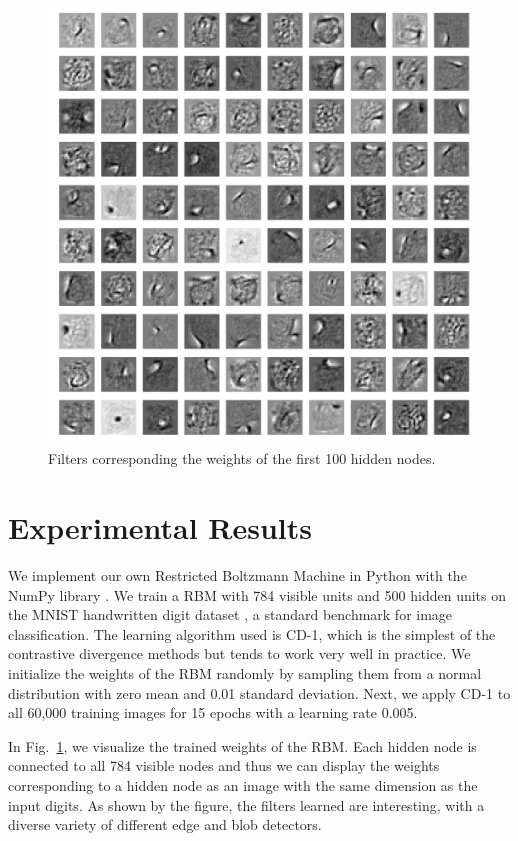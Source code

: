 \documentclass[journal]{IEEEtran}
\begin{document}
\begin{figure}[h]
  \centering
  \includegraphics[width=0.9\linewidth]{filters.png}
  \caption{Filters corresponding the weights of the first 100 hidden nodes.}
  \label{filters}
\end{figure}

\section{Experimental Results}
We implement our own Restricted Boltzmann Machine in Python with the NumPy library \cite{oliphant2006guide}. We train a RBM with 784 visible units and 500 hidden units on the MNIST handwritten digit dataset \cite{deng2012mnist}, a standard benchmark for image classification. The learning algorithm used is CD-1, which is the simplest of the contrastive divergence methods but tends to work very well in practice. We initialize the weights of the RBM randomly by sampling them from a normal distribution with zero mean and 0.01 standard deviation. Next, we apply CD-1 to all 60,000 training images for 15 epochs with a learning rate 0.005.

In Fig.~\ref{filters}, we visualize the trained weights of the RBM. Each hidden node is connected to all 784 visible nodes and thus we can display the weights corresponding to a hidden node as an image with the same dimension as the input digits. As shown by the figure, the filters learned are interesting, with a diverse variety of different edge and blob detectors. 
\end{document}
